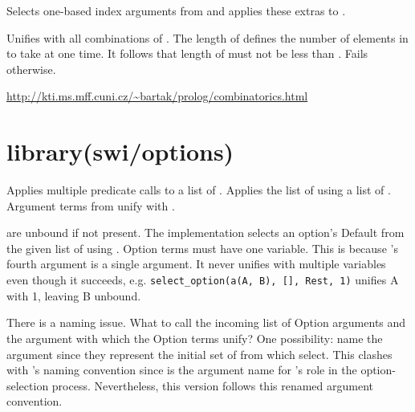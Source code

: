 \begin{description}
Selects one-based index arguments from  and applies these
extras to .

\begin{tags}
\end{tags}

Unifies  with all combinations of . The length of 
defines the number of elements in  to take at one time. It
follows that length of  must not be less than . Fails
otherwise.

\begin{tags}
\url{http://kti.ms.mff.cuni.cz/~bartak/prolog/combinatorics.html}
\end{tags}
\end{description}

\chapter{library(swi/options)}\label{sec:options}

\begin{description}
Applies multiple  predicate calls to a list of
. Applies the list of  using a list of .
Argument terms from  unify with .

 are unbound if not present. The implementation selects an
option's Default from the given list of  using
. Option terms must have one variable. This is
because 's fourth argument is a single argument. It
never unifies with multiple variables even though it succeeds, e.g.
\verb$select_option(a(A, B), [], Rest, 1)$ unifies A with 1, leaving B
unbound.

There is a naming issue. What to call the incoming list of Option
arguments and the  argument with which the Option terms
unify? One possibility: name the  argument  since
they represent the initial set of  from which 
select. This clashes with 's naming convention since
 is the argument name for 's role in the
option-selection process. Nevertheless, this version follows this
renamed argument convention.
\end{description}


